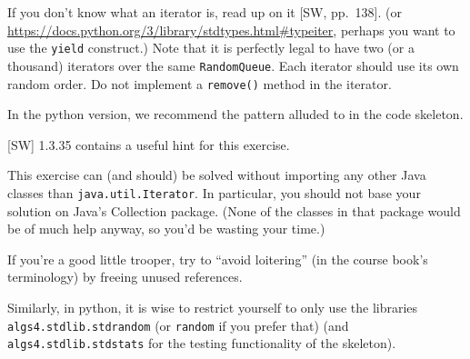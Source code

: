 \documentclass{tufte-handout}
\begin{document}
If you don't know what an iterator is, read up on it [SW, pp.~138].
(or \url{https://docs.python.org/3/library/stdtypes.html#typeiter}, perhaps you want to use the {\tt yield} construct.)
Note that it is perfectly legal to have two (or a thousand) iterators over the same {\tt RandomQueue}.
Each iterator should use its own random order.
Do not implement a {\tt remove()} method in the iterator.

In the python version, we recommend the pattern alluded to in the code skeleton.

[SW] 1.3.35 contains a useful hint for this exercise.

This exercise can (and should) be solved without importing any other
Java classes than {\tt java.util.Iterator}.
In particular, you should not base your solution on Java's Collection
package.
(None of the classes in that package would be of much help anyway, so
you'd be wasting your time.)

If you're a good little trooper, try to ``avoid loitering'' (in the course book's terminology) by freeing
unused references. 

Similarly, in python, it is wise to restrict yourself to only use the libraries {\tt algs4.stdlib.stdrandom} (or {\tt random} if you prefer that) (and {\tt algs4.stdlib.stdstats} for the testing functionality of the skeleton). 
 
\newpage 
\end{document}
